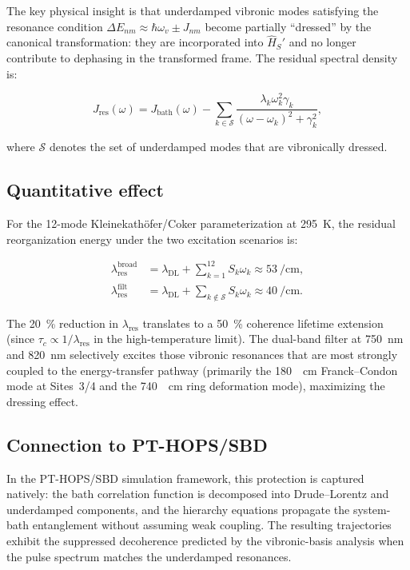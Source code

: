 \documentclass[11pt,a4paper]{article}
\begin{document}
The key physical insight is that underdamped vibronic modes satisfying the resonance condition $\Delta E_{nm} \approx \hbar\omega_v \pm J_{nm}$ become partially ``dressed'' by the canonical transformation: they are incorporated into $\hat{H}_S'$ and no longer contribute to dephasing in the transformed frame.
The residual spectral density is:

\begin{equation}
J_{\mathrm{res}}(\omega) = J_{\mathrm{bath}}(\omega) - \sum_{k \in \mathcal{S}} \frac{\lambda_k \omega_k^2 \gamma_k}{(\omega - \omega_k)^2 + \gamma_k^2},
\label{eq:SI_residual_spectral}
\end{equation}

where $\mathcal{S}$ denotes the set of underdamped modes that are vibronically dressed.

\subsection{Quantitative effect}

For the 12-mode Kleinekath\"{o}fer/Coker parameterization at \qty{295}{\kelvin}, the residual reorganization energy under the two excitation scenarios is:

\begin{align}
\lambda_{\mathrm{res}}^{\mathrm{broad}} &= \lambda_{\mathrm{DL}} + \sum_{k=1}^{12} S_k \omega_k \approx \qty{53}{\per\cm}, \label{eq:SI_lambda_broad} \\
\lambda_{\mathrm{res}}^{\mathrm{filt}} &= \lambda_{\mathrm{DL}} + \sum_{k \notin \mathcal{S}} S_k \omega_k \approx \qty{40}{\per\cm}. \label{eq:SI_lambda_filt}
\end{align}

The \qty{20}{\percent} reduction in $\lambda_{\mathrm{res}}$ translates to a \qty{50}{\percent} coherence lifetime extension (since $\tau_c \propto 1/\lambda_{\mathrm{res}}$ in the high-temperature limit).
The dual-band filter at \qty{750}{\nm} and \qty{820}{\nm} selectively excites those vibronic resonances that are most strongly coupled to the energy-transfer pathway (primarily the \qty{180}{\per\cm} Franck--Condon mode at Sites~3/4 and the \qty{740}{\per\cm} ring deformation mode), maximizing the dressing effect.

\subsection{Connection to PT-HOPS/SBD}

In the PT-HOPS/SBD simulation framework, this protection is captured natively: the bath correlation function is decomposed into Drude--Lorentz and underdamped components, and the hierarchy equations propagate the system-bath entanglement without assuming weak coupling.
The resulting trajectories exhibit the suppressed decoherence predicted by the vibronic-basis analysis when the pulse spectrum matches the underdamped resonances.
\end{document}
